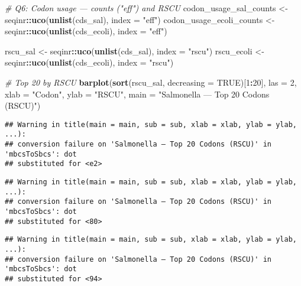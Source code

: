 \documentclass[
]{article}
\newenvironment{Shaded}{\begin{snugshade}}{\end{snugshade}}
\newcommand{\AttributeTok}[1]{\textcolor[rgb]{0.13,0.29,0.53}{#1}}
\newcommand{\CommentTok}[1]{\textcolor[rgb]{0.56,0.35,0.01}{\textit{#1}}}
\newcommand{\ConstantTok}[1]{\textcolor[rgb]{0.56,0.35,0.01}{#1}}
\newcommand{\DecValTok}[1]{\textcolor[rgb]{0.00,0.00,0.81}{#1}}
\newcommand{\FunctionTok}[1]{\textcolor[rgb]{0.13,0.29,0.53}{\textbf{#1}}}
\newcommand{\NormalTok}[1]{#1}
\newcommand{\OtherTok}[1]{\textcolor[rgb]{0.56,0.35,0.01}{#1}}
\newcommand{\SpecialCharTok}[1]{\textcolor[rgb]{0.81,0.36,0.00}{\textbf{#1}}}
\newcommand{\StringTok}[1]{\textcolor[rgb]{0.31,0.60,0.02}{#1}}
\begin{document}
\begin{Shaded}
\begin{Highlighting}[]
\CommentTok{\# Q6: Codon usage — counts ("eff") and RSCU}
\NormalTok{codon\_usage\_sal\_counts   }\OtherTok{\textless{}{-}}\NormalTok{ seqinr}\SpecialCharTok{::}\FunctionTok{uco}\NormalTok{(}\FunctionTok{unlist}\NormalTok{(cds\_sal),   }\AttributeTok{index =} \StringTok{"eff"}\NormalTok{)}
\NormalTok{codon\_usage\_ecoli\_counts }\OtherTok{\textless{}{-}}\NormalTok{ seqinr}\SpecialCharTok{::}\FunctionTok{uco}\NormalTok{(}\FunctionTok{unlist}\NormalTok{(cds\_ecoli), }\AttributeTok{index =} \StringTok{"eff"}\NormalTok{)}

\NormalTok{rscu\_sal   }\OtherTok{\textless{}{-}}\NormalTok{ seqinr}\SpecialCharTok{::}\FunctionTok{uco}\NormalTok{(}\FunctionTok{unlist}\NormalTok{(cds\_sal),   }\AttributeTok{index =} \StringTok{"rscu"}\NormalTok{)}
\NormalTok{rscu\_ecoli }\OtherTok{\textless{}{-}}\NormalTok{ seqinr}\SpecialCharTok{::}\FunctionTok{uco}\NormalTok{(}\FunctionTok{unlist}\NormalTok{(cds\_ecoli), }\AttributeTok{index =} \StringTok{"rscu"}\NormalTok{)}

\CommentTok{\# Top 20 by RSCU}
\FunctionTok{barplot}\NormalTok{(}\FunctionTok{sort}\NormalTok{(rscu\_sal,   }\AttributeTok{decreasing =} \ConstantTok{TRUE}\NormalTok{)[}\DecValTok{1}\SpecialCharTok{:}\DecValTok{20}\NormalTok{],}
        \AttributeTok{las =} \DecValTok{2}\NormalTok{, }\AttributeTok{xlab =} \StringTok{"Codon"}\NormalTok{, }\AttributeTok{ylab =} \StringTok{"RSCU"}\NormalTok{,}
        \AttributeTok{main =} \StringTok{"Salmonella — Top 20 Codons (RSCU)"}\NormalTok{)}
\end{Highlighting}
\end{Shaded}

\begin{verbatim}
## Warning in title(main = main, sub = sub, xlab = xlab, ylab = ylab, ...):
## conversion failure on 'Salmonella — Top 20 Codons (RSCU)' in 'mbcsToSbcs': dot
## substituted for <e2>
\end{verbatim}

\begin{verbatim}
## Warning in title(main = main, sub = sub, xlab = xlab, ylab = ylab, ...):
## conversion failure on 'Salmonella — Top 20 Codons (RSCU)' in 'mbcsToSbcs': dot
## substituted for <80>
\end{verbatim}

\begin{verbatim}
## Warning in title(main = main, sub = sub, xlab = xlab, ylab = ylab, ...):
## conversion failure on 'Salmonella — Top 20 Codons (RSCU)' in 'mbcsToSbcs': dot
## substituted for <94>
\end{verbatim}
\end{document}
